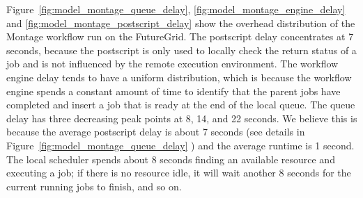 Figure~\ref{fig:model_montage_queue_delay}, \ref{fig:model_montage_engine_delay} and \ref{fig:model_montage_postscript_delay} show the overhead distribution of the Montage workflow run on the FutureGrid. The postscript delay concentrates at 7 seconds, because the postscript is only used to locally check the return status of a job and is not influenced by the remote execution environment. The workflow engine delay tends to have a uniform distribution, which is because the workflow engine spends a constant amount of time to identify that the parent jobs have completed and insert a job that is ready at the end of the local queue. 
The queue delay has three decreasing peak points at 8, 14, and 22 seconds. We believe this is because the average postscript delay is about 7 seconds (see details in Figure~\ref{fig:model_montage_queue_delay} ) and the average runtime is 1 second. The local scheduler spends about 8 seconds finding an available resource and executing a job; if there is no resource idle, it will wait another 8 seconds for the current running jobs to finish, and so on. 

%

